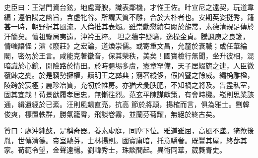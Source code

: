 \begin{pinyinscope}
 史臣曰：王湛門資台鉉，地處膏腴，識表鄰機，才惟王佐。旪宣尼之遠契，玩道韋編；遵伯陽之幽旨，含虛牝谷。所謂天質不雕，合於大朴者也。安期英姿挺秀，籍甚一時，朝野挹其風流，人倫推其表燭。雖崇勳懋績有闕於旂常，素德清規足傳於汗簡矣。懷祖鑒局夷遠，沖衿玉粹。
 坦之牆宇疑曠，逸操金貞。騰諷庾之良箋，情嗤語怪；演《廢莊》之宏論，道煥崇儒。或寄重文昌，允釐於袞職；或任華綸閣，密勿於王言。咸能克著徽音，保其榮秩，美矣！國寶檢行無聞，坐升彼相，混暗識於心鏡，開險路於情田。於時疆埸多虞，憲章罕備，天子居綴旒之連，人臣微覆餗之憂。於是竊勢擁權，黷明王之彞典；窮奢縱侈，假凶豎之餘威。繡桷雕楹，陵跨於宸極；麗珍冶質，充牣於帷房。亦猶犬彘腴肥，不知禍之將及。告盡私室，固其宜哉！荀景猷履孝居忠，無慚往烈。范玄平陳謀獻策，有會時機。崧則思業該通，緝遺經於已紊。汪則風飆直亮，抗高
 節於將顛，揚榷而言，俱為雅士。劉韓俊爽，標置軼群，勝氣籠霄，飛談卷霧，並蘭芬菊耀，無絕於終古矣。



 贊曰：處沖純懿，是稱奇器。養素虛庭，同塵下位。雅道雖屈，高風不墜。猗歟後胤，世傳清德。帝室馳芬，士林揚則。國寶庸暗，托意驕奢。既豐其屋，終蔀其家。荀範令望，金聲遠暢。劉韓秀士，珠談間起。異術同華，葳蕤青史。



\end{pinyinscope}